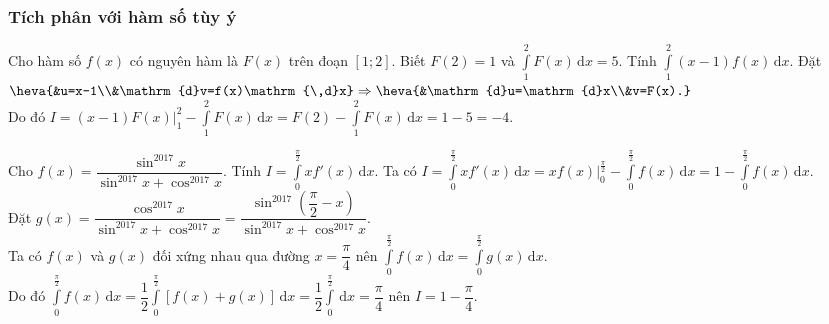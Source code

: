 \subsubsection{Tích phân với hàm số tùy ý}
\begin{ex}%
	Cho hàm số $f(x)$ có nguyên hàm là $F(x)$ trên đoạn $[1;2]$. Biết $F(2)=1$ và $\displaystyle\int\limits_{1}^{2}F(x)\mathrm{\,d}x=5$. Tính $\displaystyle\int\limits_{1}^{2}(x-1)f(x)\mathrm{\,d}x$.
	\loigiai
	{
	Đặt $\heva{&u=x-1\\&\mathrm{d}v=f(x)\mathrm{\,d}x}\Rightarrow\heva{&\mathrm{d}u=\mathrm{d}x\\&v=F(x).}$\\
	Do đó $\displaystyle I=\left.(x-1)F(x)\right|_1^2-\int\limits_1^2F(x)\mathrm{\,d}x=F(2)-\int\limits_1^2F(x)\mathrm{\,d}x=1-5=-4$.
	}
\end{ex}
\begin{ex}%
	Cho $f(x)=\dfrac{\sin^{2017}x}{\sin^{2017}x+\cos^{2017}x}$. Tính $\displaystyle I=\int\limits_0^{\frac{\pi}{2}}xf'(x)\mathrm{\,d}x$.
	\loigiai
	{
	Ta có $\displaystyle I=\int\limits_0^{\frac{\pi}{2}}xf'(x)\mathrm{\,d}x=\left.xf(x)\right|_0^{\frac{\pi}{2}}-\int\limits_0^{\frac{\pi}{2}}f(x)\mathrm{\,d}x=1-\int\limits_0^{\frac{\pi}{2}}f(x)\mathrm{\,d}x$.\\
	Đặt $g(x)=\dfrac{\cos^{2017}x}{\sin^{2017}x+\cos^{2017}x}=\dfrac{\sin^{2017}\left(\dfrac{\pi}{2}-x\right)}{\sin^{2017}x+\cos^{2017}x}$.\\
	Ta có $f(x)$ và $g(x)$ đối xứng nhau qua đường $x=\dfrac{\pi}{4}$ nên $\displaystyle\int\limits_0^{\frac{\pi}{2}}f(x)\mathrm{\,d}x=\int\limits_0^{\frac{\pi}{2}}g(x)\mathrm{\,d}x$.\\
	Do đó $\displaystyle\int\limits_0^{\frac{\pi}{2}}f(x)\mathrm{\,d}x=\dfrac{1}{2}\int\limits_0^{\frac{\pi}{2}}[f(x)+g(x)]\mathrm{\,d}x=\dfrac{1}{2}\int\limits_0^{\frac{\pi}{2}}\mathrm{\,d}x=\dfrac{\pi}{4}$ nên $I=1-\dfrac{\pi}{4}$.
	}
\end{ex}
